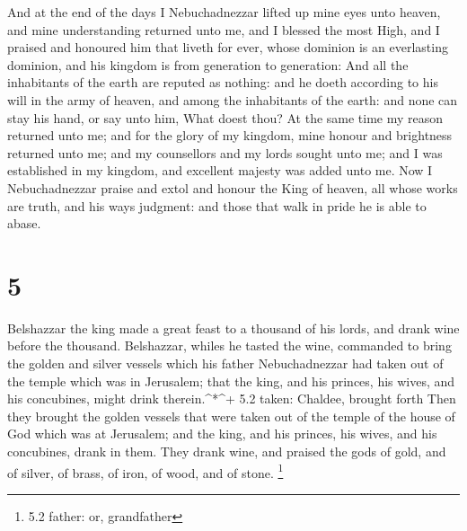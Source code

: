  And at the end of the days I Nebuchadnezzar lifted up mine
eyes unto heaven, and mine understanding returned unto me, and I blessed
the most High, and I praised and honoured him that liveth for ever,
whose dominion is an everlasting dominion, and his kingdom is from
generation to generation:  And all the inhabitants of the
earth are reputed as nothing: and he doeth according to his will in the
army of heaven, and among the inhabitants of the earth: and none can
stay his hand, or say unto him, What doest thou?  At the
same time my reason returned unto me; and for the glory of my kingdom,
mine honour and brightness returned unto me; and my counsellors and my
lords sought unto me; and I was established in my kingdom, and excellent
majesty was added unto me.  Now I Nebuchadnezzar praise and
extol and honour the King of heaven, all whose works are truth, and his
ways judgment: and those that walk in pride he is able to abase.

\hypertarget{section-4}{%
\section{5}\label{section-4}}

 Belshazzar the king made a great feast to a thousand of his
lords, and drank wine before the thousand.  Belshazzar,
whiles he tasted the wine, commanded to bring the golden and silver
vessels which his father Nebuchadnezzar had taken out of the temple
which was in Jerusalem; that the king, and his princes, his wives, and
his concubines, might drink therein.\^{}*\^{}+ 5.2 taken: Chaldee,
brought forth  Then they brought the golden vessels that
were taken out of the temple of the house of God which was at Jerusalem;
and the king, and his princes, his wives, and his concubines, drank in
them.  They drank wine, and praised the gods of gold, and of
silver, of brass, of iron, of wood, and of stone. \footnote{5.2 father:
  or, grandfather}

